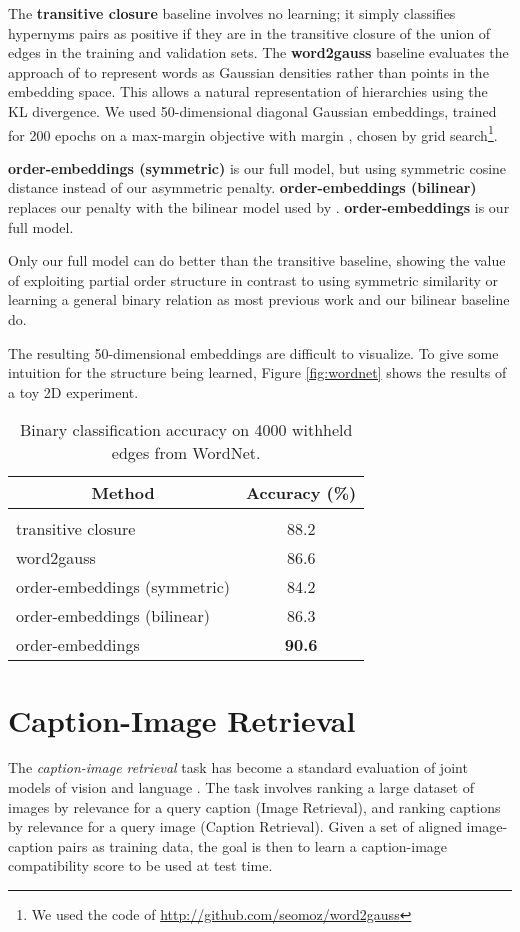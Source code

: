 \documentclass{article} \usepackage{iclr2016_conference,times}
\begin{document}
The \textbf{transitive closure} baseline involves no learning; it simply classifies hypernyms pairs as positive if they are in the transitive closure of the union of edges in the training and validation sets. The \textbf{word2gauss} baseline evaluates the approach of \citet{word2gauss} to represent words as Gaussian densities rather than points in the embedding space. This allows a natural representation of hierarchies using the KL divergence. We used 50-dimensional diagonal Gaussian embeddings, trained for 200 epochs on a max-margin objective with margin , chosen by grid search\footnote{We used the code of \url{http://github.com/seomoz/word2gauss}}.


\textbf{order-embeddings (symmetric)} is our full model, but using symmetric cosine distance instead of our asymmetric penalty. \textbf{order-embeddings (bilinear)} replaces our penalty with the bilinear model used by \citet{socher2013reasoning}. \textbf{order-embeddings} is our full model.


Only our full model can do better than the transitive baseline, showing the value of exploiting partial order structure in contrast to using symmetric similarity or learning a general binary relation as most previous work and our bilinear baseline do.

The resulting 50-dimensional embeddings are difficult to visualize. To give some intuition for the structure being learned, Figure \ref{fig:wordnet} shows the results of a toy 2D experiment.

\begin{table}[t]
	\begin{center}
		\begin{tabular}{lc}
			\multicolumn{1}{c}{\bf Method}  &\multicolumn{1}{c}{\bf Accuracy (\%)}
			\\ \hline \\
			transitive closure & 88.2 \\
			word2gauss  &  86.6\\
			order-embeddings (symmetric) & 84.2 \\
			order-embeddings (bilinear) & 86.3 \\
			order-embeddings  & \textbf{90.6} \\
		\end{tabular}
	\end{center}
	\caption{Binary classification accuracy on 4000 withheld edges from WordNet.}
	\label{wordnet}
\end{table}
 
\section{Caption-Image Retrieval}
\label{retrieval}
The {\it caption-image retrieval} task has become a standard evaluation of joint models of vision and language  \citep{hodosh2013framing,LinCVPR14}. The task involves ranking a large dataset of images by relevance for a query caption (Image Retrieval), and ranking captions by relevance for a query image (Caption Retrieval). Given a set of aligned image-caption pairs as training data, the goal is then to learn a caption-image compatibility score  to be used at test time.
\end{document}
